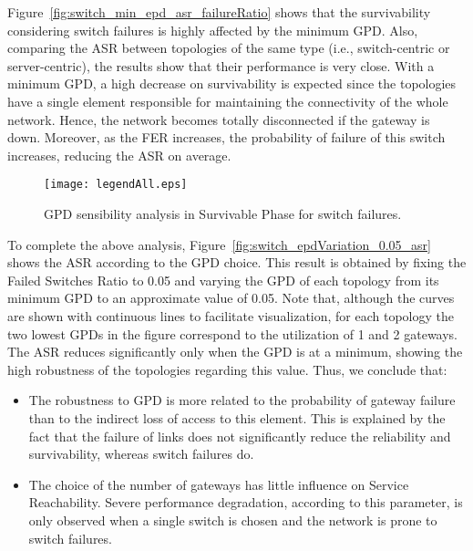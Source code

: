 Figure~\ref{fig:switch_min_epd_asr_failureRatio} shows that the survivability considering switch failures is highly affected by the minimum GPD. Also, comparing the ASR between topologies of the same type (i.e., switch-centric or server-centric), the results show that their performance is very close.
With a minimum GPD, a high decrease on survivability is expected since the topologies have a single element responsible for maintaining the connectivity of the whole network.
Hence, the network becomes totally disconnected if the gateway is down. Moreover, as the FER increases, the probability of failure of this switch increases, reducing the ASR on average. 
\begin{figure}
\centering
{}
{\texttt{[image: legendAll.eps]}}
\caption{GPD sensibility analysis in Survivable Phase for switch failures.}
\end{figure}

To complete the above analysis, Figure~\ref{fig:switch_epdVariation_0.05_asr} shows the ASR according to the GPD choice. This result is obtained by fixing the Failed Switches Ratio to 0.05 and varying the GPD of each topology from its minimum GPD to an approximate value of 0.05. Note that, although the curves are shown with continuous lines to facilitate visualization, for each topology the two lowest GPDs in the figure correspond to the utilization of 1 and 2 gateways. The ASR reduces significantly only when the GPD is at a minimum, showing the high robustness of the topologies regarding this value. Thus, we conclude that: 
\begin{itemize}
\item The robustness to GPD is more related to the probability of gateway failure than to the indirect loss of access to this element. This is explained by the fact that the failure of links does not significantly reduce the reliability and survivability, whereas switch failures do.
\item The choice of the number of gateways has little influence on Service Reachability. Severe performance degradation, according to this parameter, is only observed when a single switch is chosen and the network is prone to switch failures. 
\end{itemize}

